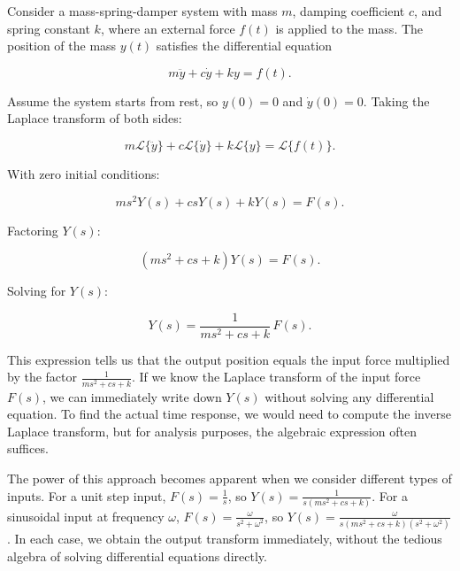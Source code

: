 \begin{example}
Consider a mass-spring-damper system with mass $m$, damping coefficient $c$, and spring constant $k$, where an external force $f(t)$ is applied to the mass. The position of the mass $y(t)$ satisfies the differential equation

\[
m \ddot{y} + c \dot{y} + k y = f(t).
\]

Assume the system starts from rest, so $y(0) = 0$ and $\dot{y}(0) = 0$. Taking the Laplace transform of both sides:

\[
m \mathcal{L}\{\ddot{y}\} + c \mathcal{L}\{\dot{y}\} + k \mathcal{L}\{y\} = \mathcal{L}\{f(t)\}.
\]

With zero initial conditions:

\[
m s^2 Y(s) + c s Y(s) + k Y(s) = F(s).
\]

Factoring $Y(s)$:

\[
(ms^2 + cs + k) Y(s) = F(s).
\]

Solving for $Y(s)$:

\[
Y(s) = \frac{1}{ms^2 + cs + k} \, F(s).
\]

This expression tells us that the output position equals the input force multiplied by the factor $\frac{1}{ms^2 + cs + k}$. If we know the Laplace transform of the input force $F(s)$, we can immediately write down $Y(s)$ without solving any differential equation. To find the actual time response, we would need to compute the inverse Laplace transform, but for analysis purposes, the algebraic expression often suffices.
\end{example}

The power of this approach becomes apparent when we consider different types of inputs. For a unit step input, $F(s) = \frac{1}{s}$, so $Y(s) = \frac{1}{s(ms^2 + cs + k)}$. For a sinusoidal input at frequency $\omega$, $F(s) = \frac{\omega}{s^2 + \omega^2}$, so $Y(s) = \frac{\omega}{s(ms^2 + cs + k)(s^2 + \omega^2)}$. In each case, we obtain the output transform immediately, without the tedious algebra of solving differential equations directly.

